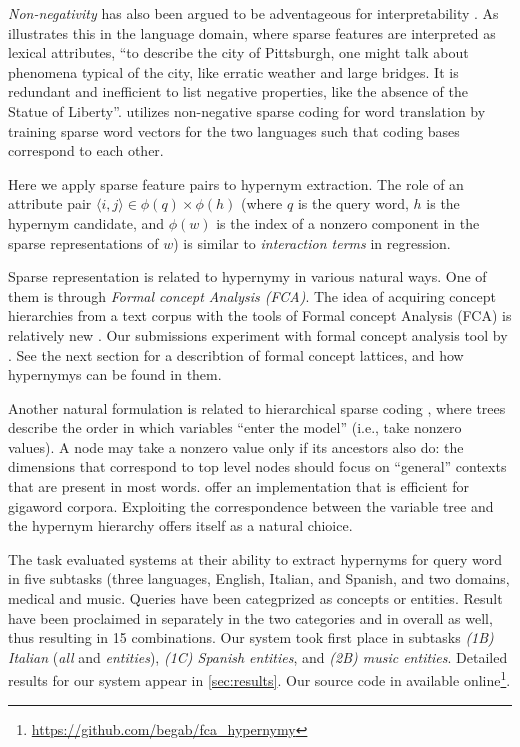 \documentclass[11pt,a4paper]{article}
\begin{document}
\emph{Non-negativity} has also been argued to be adventageous for interpretability
\citep{Faruqui:2015,Fyshe:2015,Arora:2016}. As \citet{Subramanian:2018}
illustrates this in the language domain, where sparse features are interpreted
as lexical attributes, ``to describe the city of Pittsburgh, one might talk
about phenomena typical of the city, like erratic weather and large bridges. It
is redundant and inefficient to list negative properties, like the absence of
the Statue of Liberty''.
\citet{Berend:2018} utilizes non-negative sparse coding for word translation by
training sparse word vectors for the two languages such that coding bases
correspond to each other.

Here we apply sparse feature pairs to hypernym extraction. The role of an
attribute pair $\langle i,j\rangle\in\phi(q)\times\phi(h)$ (where $q$ is the query word,
$h$ is the hypernym candidate, and $\phi(w)$ is the index of a nonzero
component in the sparse representations of $w$) is similar to \emph{interaction
terms} in regression.

Sparse representation is related to hypernymy in various natural ways.  One of
them is through \emph{Formal concept Analysis (FCA)}.  The idea of acquiring concept
hierarchies from a text corpus with the tools of Formal concept Analysis (FCA)
is relatively new \citep{Cimiano:2005}.
Our submissions experiment with formal concept analysis tool by
\citet{Endres:2010}. See the next section for a describtion of formal concept
lattices, and how hypernymys can be found in them.

Another natural formulation is related to hierarchical sparse coding
\citep{Zhao:2009}, where trees describe the order in which variables “enter the
model” (i.e., take nonzero values). A node may take a nonzero value only if its
ancestors also do: the dimensions that correspond to top level nodes should
focus on “general” contexts that are present in most words.
\citet{Yogatama:2015} offer an implementation that is efficient for gigaword
corpora. Exploiting the correspondence between the variable tree and the
hypernym hierarchy offers itself as a natural chioice.

The task \citep{Camacho-Collados:2018} evaluated systems at their ability to
extract hypernyms for query word in five subtasks (three languages, English,
Italian, and Spanish, and two domains, medical and music. Queries have been
categprized as concepts or entities. Result have been proclaimed in separately
in the two categories and in overall as well, thus resulting in 15
combinations.
  Our system took first place in subtasks
  \emph{(1B) Italian} (\emph{all} and \emph{entities}),
  \emph{(1C) Spanish entities}, and
  \emph{(2B) music entities}.
Detailed results for our system appear in \autoref{sec:results}.
Our source code in available
online\footnote{\url{https://github.com/begab/fca_hypernymy}}.
\end{document}
